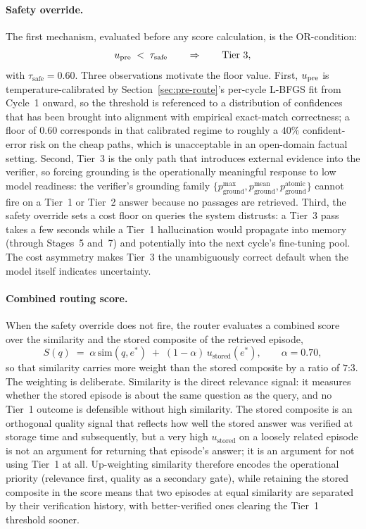 \paragraph{Safety override.}
The first mechanism, evaluated before any score calculation, is the OR-condition:
\begin{equation}
u_{\text{pre}} \;<\; \tau_{\text{safe}} \qquad \Rightarrow \qquad \text{Tier~3},
\label{eq:or-condition}
\end{equation}
with $\tau_{\text{safe}} = 0.60$. Three observations motivate the floor value. First, $u_{\text{pre}}$ is temperature-calibrated by Section~\ref{sec:pre-route}'s per-cycle L-BFGS fit from Cycle~1 onward, so the threshold is referenced to a distribution of confidences that has been brought into alignment with empirical exact-match correctness; a floor of $0.60$ corresponds in that calibrated regime to roughly a $40\%$ confident-error risk on the cheap paths, which is unacceptable in an open-domain factual setting. Second, Tier~3 is the only path that introduces external evidence into the verifier, so forcing grounding is the operationally meaningful response to low model readiness: the verifier's grounding family $\{p_{\text{ground}}^{\max}, p_{\text{ground}}^{\text{mean}}, p_{\text{ground}}^{\text{atomic}}\}$ cannot fire on a Tier~1 or Tier~2 answer because no passages are retrieved. Third, the safety override sets a cost floor on queries the system distrusts: a Tier~3 pass takes a few seconds while a Tier~1 hallucination would propagate into memory (through Stages~5 and~7) and potentially into the next cycle's fine-tuning pool. The cost asymmetry makes Tier~3 the unambiguously correct default when the model itself indicates uncertainty.

\paragraph{Combined routing score.}
When the safety override does not fire, the router evaluates a combined score over the similarity and the stored composite of the retrieved episode,
\begin{equation}
S(q) \;=\; \alpha\,\mathrm{sim}(q, e^{*}) \;+\; (1 - \alpha)\,u_{\text{stored}}(e^{*}), \qquad \alpha = 0.70,
\label{eq:routing-score}
\end{equation}
so that similarity carries more weight than the stored composite by a ratio of $7$:$3$. The weighting is deliberate. Similarity is the direct relevance signal: it measures whether the stored episode is about the same question as the query, and no Tier~1 outcome is defensible without high similarity. The stored composite is an orthogonal quality signal that reflects how well the stored answer was verified at storage time and subsequently, but a very high $u_{\text{stored}}$ on a loosely related episode is not an argument for returning that episode's answer; it is an argument for not using Tier~1 at all. Up-weighting similarity therefore encodes the operational priority (relevance first, quality as a secondary gate), while retaining the stored composite in the score means that two episodes at equal similarity are separated by their verification history, with better-verified ones clearing the Tier~1 threshold sooner.

